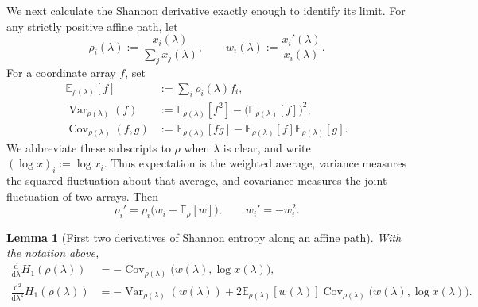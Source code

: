 \documentclass[aps,pra,11pt,onecolumn,nofootinbib,tightenlines]{revtex4-2}
\newtheorem{lemma}[theorem]{Lemma}
\theoremstyle{definition}
\begin{document}
We next calculate the Shannon derivative exactly enough to identify its limit.  For any strictly positive affine path, let
\begin{equation}
 \rho_i(\lambda):=\frac{x_i(\lambda)}{\sum_jx_j(\lambda)},
 \qquad
 w_i(\lambda):=\frac{x_i'(\lambda)}{x_i(\lambda)}.
 \label{eq:app-Shannon-p-w}
\end{equation}
For a coordinate array $f$, set
\begin{align}
\mathbb E_{\rho(\lambda)}[f]
&:=\sum_i \rho_i(\lambda)f_i,
\label{eq:app-Shannon-expectation-definition}\\
\operatorname{Var}_{\rho(\lambda)}(f)
&:=\mathbb E_{\rho(\lambda)}[f^2]
-\bigl(\mathbb E_{\rho(\lambda)}[f]\bigr)^2,
\label{eq:app-Shannon-variance-definition}\\
\operatorname{Cov}_{\rho(\lambda)}(f,g)
&:=\mathbb E_{\rho(\lambda)}[fg]
-\mathbb E_{\rho(\lambda)}[f]\mathbb E_{\rho(\lambda)}[g].
\label{eq:app-Shannon-covariance-definition}
\end{align}
We abbreviate these subscripts to $\rho$ when $\lambda$ is clear, and write
$(\log x)_i:=\log x_i$.  Thus expectation is the weighted average, variance
measures the squared fluctuation about that average, and covariance measures
the joint fluctuation of two arrays.
Then
\begin{equation}
 \rho_i'=\rho_i\bigl(w_i-\mathbb E_\rho[w]\bigr),
 \qquad
 w_i'=-w_i^2.
 \label{eq:app-Shannon-pw-primes}
\end{equation}

\begin{lemma}[First two derivatives of Shannon entropy along an affine path]
\label{lem:app-Shannon-covariance}
With the notation above,
\begin{align}
 \frac{\mathrm d}{\mathrm d\lambda}H_1(\rho(\lambda))
 &=-\operatorname{Cov}_{\rho(\lambda)}
   \bigl(w(\lambda),\log x(\lambda)\bigr),
 \label{eq:app-Shannon-first-cov}\\
 \frac{\mathrm d^2}{\mathrm d\lambda^2}H_1(\rho(\lambda))
 &=-\operatorname{Var}_{\rho(\lambda)}(w(\lambda))
 +2\mathbb E_{\rho(\lambda)}[w(\lambda)]
  \operatorname{Cov}_{\rho(\lambda)}
  \bigl(w(\lambda),\log x(\lambda)\bigr).
 \label{eq:app-Shannon-second-cov}
\end{align}
\end{lemma}
\end{document}
